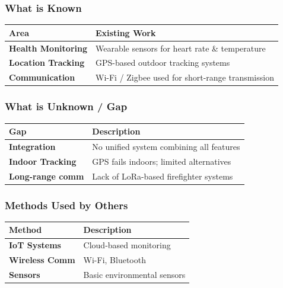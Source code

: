 \documentclass[12pt,a4paper]{article}
\begin{document}
	\subsubsection{What is Known}
	\begin{center}
		\begin{tabular}{>{\bfseries}p{4cm} p{9cm}}
			\toprule
			Area & Existing Work \\
			\midrule
			Health Monitoring & Wearable sensors for heart rate \& temperature \\
			Location Tracking & GPS-based outdoor tracking systems \\
			Communication & Wi-Fi / Zigbee used for short-range transmission \\
			\bottomrule
		\end{tabular}
	\end{center}
	
	\subsubsection{What is Unknown / Gap}
	\begin{center}
		\begin{tabular}{>{\bfseries}p{4cm} p{9cm}}
			\toprule
			Gap & Description \\
			\midrule
			Integration & No unified system combining all features \\
			Indoor Tracking & GPS fails indoors; limited alternatives \\
			Long-range comm & Lack of LoRa-based firefighter systems \\
			\bottomrule
		\end{tabular}
	\end{center}
	
	\subsubsection{Methods Used by Others}
	\begin{center}
		\begin{tabular}{>{\bfseries}p{4cm} p{9cm}}
			\toprule
			Method & Description \\
			\midrule
			IoT Systems & Cloud-based monitoring \\
			Wireless Comm & Wi-Fi, Bluetooth \\
			Sensors & Basic environmental sensors \\
			\bottomrule
		\end{tabular}
	\end{center}
	
\end{document}
